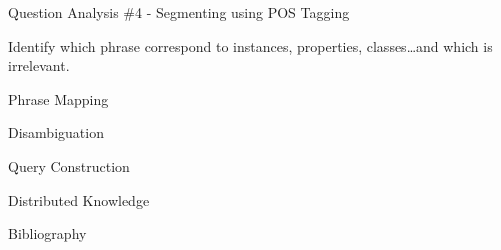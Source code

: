 \documentclass{beamer}
\begin{document}

\begin{frame}{Question Analysis \#4 - Segmenting using POS Tagging}
  \begin{card}
    Identify which phrase correspond to instances, properties, classes\dots and which is irrelevant.
  \end{card}
\end{frame}

\begin{frame}{Phrase Mapping}
\end{frame}
\begin{frame}{Disambiguation}
\end{frame}
\begin{frame}{Query Construction}
\end{frame}
\begin{frame}{Distributed Knowledge}
\end{frame}

\begin{frame}{Bibliography}
  \printbibliography
\end{frame}
\end{document}
